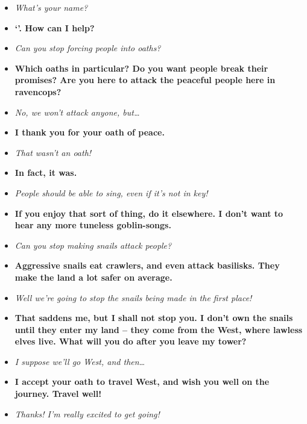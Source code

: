 \begin{multicols}{2}
\pagebreak
\begin{itemize}
  \item\it
  What's your name?
  \item[\adforn{54}]\bf
  `'.
  How can I help?
  \item\it
  Can you stop forcing people into oaths?
  \item[\adforn{54}]\bf
  Which oaths in particular?
  Do you want people break their promises?
  Are you here to attack the peaceful people here in \gls{ravencops}?
  \item\it
  No, we won't attack anyone, but\ldots
  \item[\adforn{54}]\bf
  I thank you for your oath of peace.
  \item\it
  That wasn't an oath!
  \item[\adforn{54}]\bf
  In fact, it was.
  \item\it
  People should be able to sing, even if it's not in key!
  \item[\adforn{54}]\bf
  If you enjoy that sort of thing, do it elsewhere.
  I don't want to hear any more tuneless goblin-songs.
  \item\it
  Can you stop making snails attack people?
  \item[\adforn{54}]\bf
  Aggressive snails eat \glspl{crawler}, and even attack \glspl{basilisk}.
  They make the land a lot safer on average.
  \item\it
  Well we're going to stop the snails being made in the first place!
  \item[\adforn{54}]\bf
  That saddens me, but I shall not stop you.
  I don't own the snails until they enter my land -- they come from the West, where lawless elves live.
  What will you do after you leave my tower?
  \item\it
  I suppose we'll go West, and then\ldots
  \item[\adforn{54}]\bf
  I accept your oath to travel West, and wish you well on the journey.
  Travel well!
  \item\it
  Thanks!
  I'm really excited to get going!
\end{itemize}

\MindElder

\showStdSpells[
  
  
  
  
]

\label{oathlessLovers}


\end{multicols}
